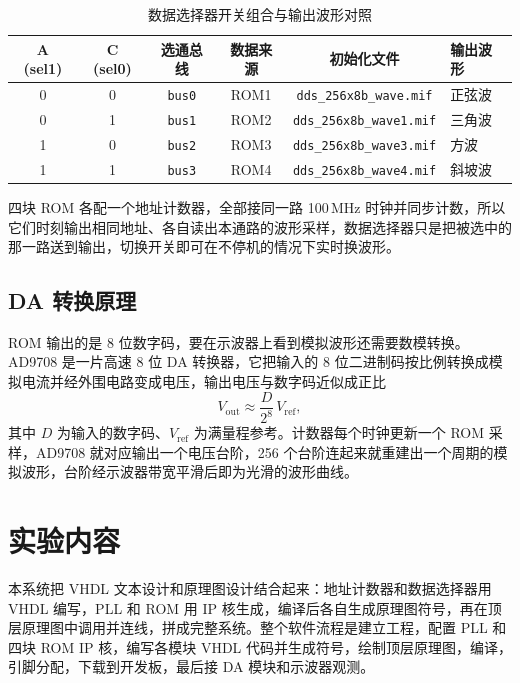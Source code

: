 \documentclass{ctexrep}
\begin{document}
\begin{table}[H]
    \centering
    \caption{数据选择器开关组合与输出波形对照}
    \label{e6:tab:mux}
    \begin{tabular}{cccccl}
        \toprule
        \textbf{A (sel1)} & \textbf{C (sel0)} & \textbf{选通总线} & \textbf{数据来源} & \textbf{初始化文件} & \textbf{输出波形} \\
        \midrule
        0 & 0 & \texttt{bus0} & ROM1 & \texttt{dds\_256x8b\_wave.mif}  & 正弦波 \\
        0 & 1 & \texttt{bus1} & ROM2 & \texttt{dds\_256x8b\_wave1.mif} & 三角波 \\
        1 & 0 & \texttt{bus2} & ROM3 & \texttt{dds\_256x8b\_wave3.mif} & 方波 \\
        1 & 1 & \texttt{bus3} & ROM4 & \texttt{dds\_256x8b\_wave4.mif} & 斜坡波 \\
        \bottomrule
    \end{tabular}
\end{table}

四块 ROM 各配一个地址计数器，全部接同一路 100\,MHz 时钟并同步计数，所以它们时刻输出相同地址、各自读出本通路的波形采样，数据选择器只是把被选中的那一路送到输出，切换开关即可在不停机的情况下实时换波形。

\subsection{DA 转换原理}

ROM 输出的是 8 位数字码，要在示波器上看到模拟波形还需要数模转换。AD9708 是一片高速 8 位 DA 转换器，它把输入的 8 位二进制码按比例转换成模拟电流并经外围电路变成电压，输出电压与数字码近似成正比
\[
    V_{\text{out}} \approx \frac{D}{2^{8}} \, V_{\text{ref}},
\]
其中 $D$ 为输入的数字码、$V_{\text{ref}}$ 为满量程参考。计数器每个时钟更新一个 ROM 采样，AD9708 就对应输出一个电压台阶，256 个台阶连起来就重建出一个周期的模拟波形，台阶经示波器带宽平滑后即为光滑的波形曲线。

\section{实验内容}

本系统把 VHDL 文本设计和原理图设计结合起来：地址计数器和数据选择器用 VHDL 编写，PLL 和 ROM 用 IP 核生成，编译后各自生成原理图符号，再在顶层原理图中调用并连线，拼成完整系统。整个软件流程是建立工程，配置 PLL 和四块 ROM IP 核，编写各模块 VHDL 代码并生成符号，绘制顶层原理图，编译，引脚分配，下载到开发板，最后接 DA 模块和示波器观测。
\end{document}
